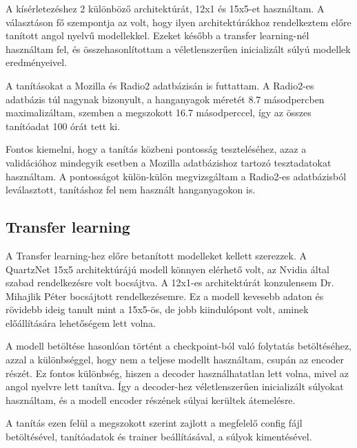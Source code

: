 A kísérletezéshez 2 különböző architektúrát, 12x1 és 15x5-et használtam. A választáson fő szempontja az volt, hogy ilyen architektúrákhoz rendelkeztem előre tanított angol nyelvű modellekkel. Ezeket később a transfer learning-nél használtam fel, és összehasonlítottam a véletlenszerűen inicializált súlyú modellek eredményeivel.

A tanításokat a Mozilla és Radio2 adatbázisán is futtattam. A Radio2-es adatbázis túl nagynak bizonyult, a hanganyagok méretét 8.7 másodpercben maximalizáltam, szemben a megszokott 16.7 másodperccel, így az összes tanítóadat 100 órát tett ki.


Fontos kiemelni, hogy a tanítás közbeni pontosság teszteléséhez, azaz a validációhoz mindegyik esetben a Mozilla adatbázishoz tartozó tesztadatokat használtam. A pontosságot külön-külön megvizsgáltam a Radio2-es adatbázisból leválasztott, tanításhoz fel nem használt hanganyagokon is.

\subsection{Transfer learning}

A Transfer learning-hez előre betanított modelleket kellett szerezzek. A QuartzNet 15x5 architektúrájú modell könnyen elérhető volt, az Nvidia által szabad rendelkezésre volt bocsájtva. A 12x1-es architektúrát konzulensem Dr. Mihajlik Péter bocsájtott rendelkezésemre. Ez a modell kevesebb adaton és rövidebb ideig tanult mint a 15x5-ös, de jobb kiindulópont volt, aminek előállítására lehetőségem lett volna.

A modell betöltése hasonlóan történt a checkpoint-ból való folytatás betöltéséhez, azzal a különbséggel, hogy nem a teljese modellt használtam, csupán az encoder részét. Ez fontos különbség, hiszen a decoder használhatatlan lett volna, mivel az angol nyelvre lett tanítva. Így a decoder-hez véletlenszerűen inicializált súlyokat használtam, és a modell encoder részének súlyai kerültek átemelésre.

A tanítás ezen felül a megszokott szerint zajlott a megfelelő config fájl betöltésével, tanítóadatok és trainer beállításával, a súlyok kimentésével.